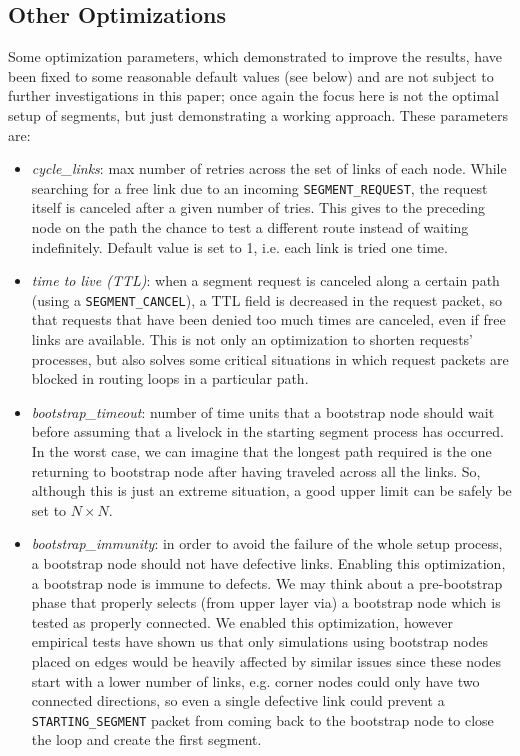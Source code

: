 \subsection{Other Optimizations}
Some optimization parameters, which demonstrated to improve the \disr{}
results, have been fixed to some reasonable default values (see below) and are not subject to
further investigations in this paper; once again the focus here is not the
optimal setup of segments, but just demonstrating a working approach. 
These parameters are:
\begin{itemize}
\item \emph{cycle\_links}: max number of retries across the set of links of
each node. While searching for a free link due to an incoming \texttt{SEGMENT\_REQUEST},
the request itself is canceled after a given number of tries. This
gives to the preceding node on the path the
chance to test a different route instead of waiting indefinitely.
Default value is set to 1, i.e. each link is tried one time.
\item \emph{time to live (TTL)}: when a segment request is canceled
along a certain path (using a \texttt{SEGMENT\_CANCEL}), a TTL field is
decreased in the request packet, so that requests that have been
denied too much times are canceled, even if free links are
available. This is not only an optimization to shorten
requests' processes, but also solves some critical situations in which
request packets are blocked in routing loops in a particular path.
\item \emph{bootstrap\_timeout}: number of time units that a bootstrap node
should wait before assuming that a livelock in the starting segment
process has occurred. In the worst case, we can imagine that the longest
path required is the one returning to bootstrap node after having
traveled across all the links. So, although this is just an extreme
situation, a good upper limit can be safely be set to $N \times N$.
\item \emph{bootstrap\_immunity}: in order to avoid the failure of the whole \disr{}
setup process, a bootstrap node should not have defective links.
Enabling this optimization, a bootstrap node is immune to defects.
We may think about a pre-bootstrap phase that properly selects (from upper
layer via) a bootstrap node which is tested as properly connected. We
enabled this optimization, however empirical tests have shown us that only
simulations using bootstrap nodes placed on edges would be heavily
affected by similar issues since these nodes start with a lower number of links,
e.g. corner nodes could only have two connected directions, so even a single
defective link could prevent a \texttt{STARTING\_SEGMENT} packet from coming back to the
bootstrap node to close the loop and create the first segment.
\end{itemize}
